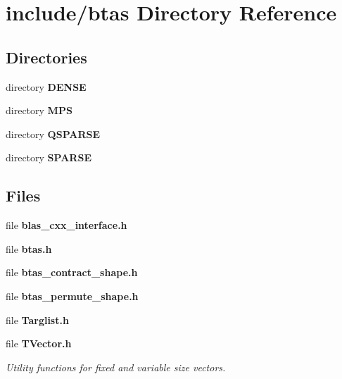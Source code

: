 \section{include/btas Directory Reference}
\label{dir_c5282a789aff8f2bf2cf3e946a22c866}
\subsection*{Directories}
\begin{DoxyCompactItemize}
\item 
directory {\bf D\-E\-N\-S\-E}
\item 
directory {\bf M\-P\-S}
\item 
directory {\bf Q\-S\-P\-A\-R\-S\-E}
\item 
directory {\bf S\-P\-A\-R\-S\-E}
\end{DoxyCompactItemize}
\subsection*{Files}
\begin{DoxyCompactItemize}
\item 
file {\bf blas\-\_\-cxx\-\_\-interface.\-h}
\item 
file {\bf btas.\-h}
\item 
file {\bf btas\-\_\-contract\-\_\-shape.\-h}
\item 
file {\bf btas\-\_\-permute\-\_\-shape.\-h}
\item 
file {\bf Targlist.\-h}
\item 
file {\bf T\-Vector.\-h}
\begin{DoxyCompactList}\small\item\em Utility functions for fixed and variable size vectors. \end{DoxyCompactList}\end{DoxyCompactItemize}
